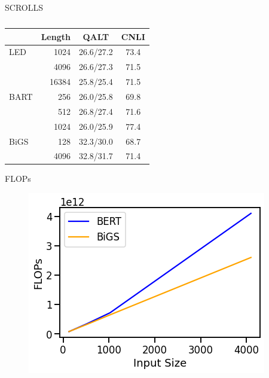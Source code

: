 \documentclass[14pt,aspectratio=169]{beamer}
\begin{document}



\begin{frame}{SCROLLS}
    \begin{table}[tb]
    \centering
    \begin{tabular}{lr|cc}
    \toprule
        & Length & QALT & CNLI \\
    \midrule
         LED  & 1024    &  26.6/27.2  & 73.4\\
           & 4096    &  26.6/27.3  & 71.5\\
           & 16384   &  25.8/25.4   & 71.5\\
         \midrule
         BART & 256  &  26.0/25.8 & 69.8\\
          & 512  &  26.8/27.4 & 71.6\\
          & 1024 &  26.0/25.9 & 77.4\\
         \midrule
         BiGS & 128  & 32.3/30.0 & 68.7 \\
          & 4096 & 32.8/31.7 & 71.4 \\
    \bottomrule
    \end{tabular}
    \caption{}
    \label{tab:scroll}
\end{table}
\end{frame}

\begin{frame}{FLOPs}
\begin{figure}
    \centering
    \includegraphics[height=0.5\textheight]{Figs/graph2.png}

    \label{fig:my_label}
\end{figure}
\end{frame}
\end{document}
